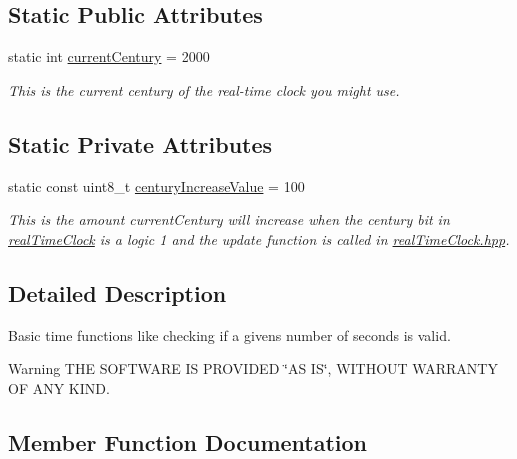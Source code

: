 \subsection*{Static Public Attributes}
\begin{DoxyCompactItemize}
\item 
static int \mbox{\hyperlink{classtime_acab6780ebb25862cb83316cb967b8b57}{current\+Century}} = 2000
\begin{DoxyCompactList}\small\item\em This is the current century of the real-\/time clock you might use. \end{DoxyCompactList}\end{DoxyCompactItemize}
\subsection*{Static Private Attributes}
\begin{DoxyCompactItemize}
\item 
\mbox{\label{classtime_af12b7ed0d7ff922e00ecb46dabdaede6}} 
static const uint8\+\_\+t \mbox{\hyperlink{classtime_af12b7ed0d7ff922e00ecb46dabdaede6}{century\+Increase\+Value}} = 100
\begin{DoxyCompactList}\small\item\em This is the amount current\+Century will increase when the century bit in \mbox{\hyperlink{classreal_time_clock}{real\+Time\+Clock}} is a logic 1 and the update function is called in \mbox{\hyperlink{real_time_clock_8hpp_source}{real\+Time\+Clock.\+hpp}}. \end{DoxyCompactList}\end{DoxyCompactItemize}


\subsection{Detailed Description}
Basic time functions like checking if a givens number of seconds is valid. 

\begin{DoxyWarning}{Warning}
T\+HE S\+O\+F\+T\+W\+A\+RE IS P\+R\+O\+V\+I\+D\+ED \char`\"{}\+A\+S I\+S\char`\"{}, W\+I\+T\+H\+O\+UT W\+A\+R\+R\+A\+N\+TY OF A\+NY K\+I\+ND. 
\end{DoxyWarning}


\subsection{Member Function Documentation}
\mbox{\label{classtime_a35f54f331571b5bc8135f586045d753e}} 
